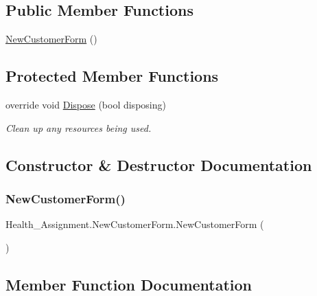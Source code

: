 \subsection*{Public Member Functions}
\begin{DoxyCompactItemize}
\item 
\hyperlink{class_health___assignment_1_1_new_customer_form_a25d6977bd812c91e3193fa569a2f7860}{New\+Customer\+Form} ()
\end{DoxyCompactItemize}
\subsection*{Protected Member Functions}
\begin{DoxyCompactItemize}
\item 
override void \hyperlink{class_health___assignment_1_1_new_customer_form_a9f0ce4bc0c5e07330f2353bd341a94e5}{Dispose} (bool disposing)
\begin{DoxyCompactList}\small\item\em Clean up any resources being used. \end{DoxyCompactList}\end{DoxyCompactItemize}


\subsection{Constructor \& Destructor Documentation}
\mbox{\label{class_health___assignment_1_1_new_customer_form_a25d6977bd812c91e3193fa569a2f7860}} 
\subsubsection{\texorpdfstring{New\+Customer\+Form()}{NewCustomerForm()}}
{\footnotesize\ttfamily Health\+\_\+\+Assignment.\+New\+Customer\+Form.\+New\+Customer\+Form (\begin{DoxyParamCaption}{ }\end{DoxyParamCaption})\hspace{0.3cm}{\ttfamily [inline]}}



\subsection{Member Function Documentation}
\mbox{\label{class_health___assignment_1_1_new_customer_form_a9f0ce4bc0c5e07330f2353bd341a94e5}} 
